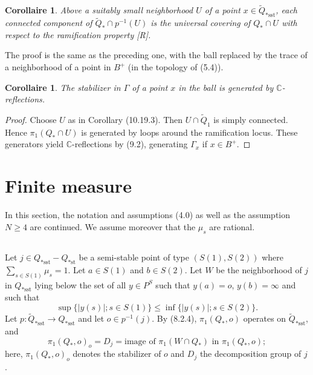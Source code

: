 \documentclass[12pt,a4paper]{article}
\theoremstyle{plain}
\newtheorem{corollary}[theorem]{Corollaire}
\theoremstyle{definition}
\theoremstyle{remark}
\begin{document}
\begin{corollary}
\label{10.19.3}
Above a suitably small neighborhood $U$ of a point $x \in \widetilde{Q}_{*\text{sst}}$, each connected component of $\widetilde{Q}_* \cap p^{-1}(U)$ is the universal covering of $Q_* \cap U$ with respect to the ramification property [R].
\end{corollary}

The proof is the same as the preceding one, with the ball replaced by the trace of a neighborhood of a point in $B^+$ (in the topology of (5.4)).

\begin{corollary}
\label{10.19.4}
The stabilizer in $\Gamma$ of a point $x$ in the ball is generated by $\mathbb{C}$-reflections.
\end{corollary}

\begin{proof}
Choose $U$ as in Corollary (10.19.3). Then $U \cap \widetilde{Q}_1$ is simply connected. Hence $\pi_1(Q_* \cap U)$ is generated by loops around the ramification locus. These generators yield $\mathbb{C}$-reflections by (9.2), generating $\Gamma_x$ if $x \in B^+$.
\end{proof}

\section{Finite measure}
\label{sec:11}

In this section, the notation and assumptions (4.0) as well as the assumption $N \geqslant 4$ are continued. We assume moreover that the $\mu_s$ are rational.

\subsection{}
\label{11.1}

Let $j \in Q_{*\text{sst}} - Q_{*\text{st}}$ be a semi-stable point of type $(S(1), S(2))$ where $\sum_{s \in S(1)} \mu_s = 1$. Let $a \in S(1)$ and $b \in S(2)$. Let $W$ be the neighborhood of $j$ in $Q_{*\text{sst}}$ lying below the set of all $y \in P^S$ such that $y(a) = o$, $y(b) = \infty$ and such that
\[
\sup \{|y(s)|; s \in S(1)\} \leqslant \inf \{|y(s)|; s \in S(2)\}.
\]
Let $p : \widetilde{Q}_{*\text{sst}} \to Q_{*\text{sst}}$ and let $o \in p^{-1}(j)$. By (8.2.4), $\pi_1(Q_*, o)$ operates on $\widetilde{Q}_{*\text{sst}}$, and
\[
\pi_1(Q_*, o)_o = D_j = \text{image of } \pi_1(W \cap Q_*) \text{ in } \pi_1(Q_*, o);
\]
here, $\pi_1(Q_*, o)_o$ denotes the stabilizer of $o$ and $D_j$ the decomposition group of $j$.
\end{document}
